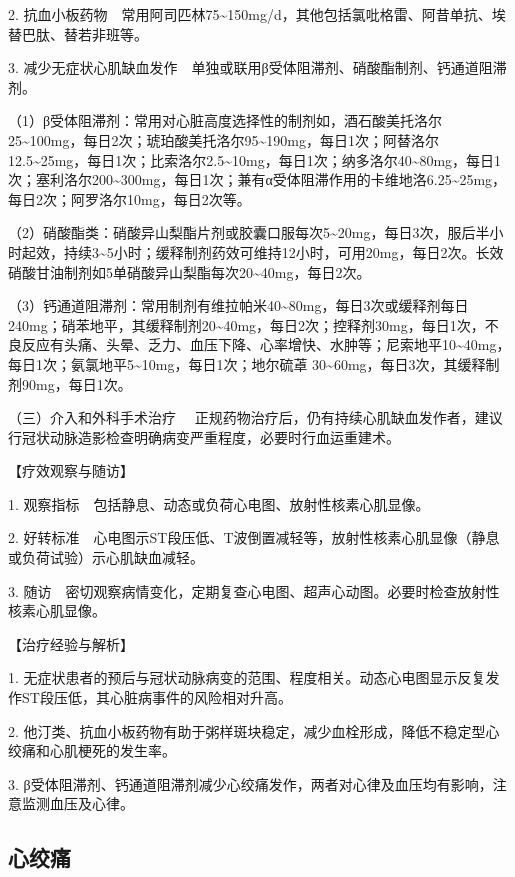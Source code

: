2.
抗血小板药物　常用阿司匹林75\textasciitilde{}150mg/d，其他包括氯吡格雷、阿昔单抗、埃替巴肽、替若非班等。

3.
减少无症状心肌缺血发作　单独或联用β受体阻滞剂、硝酸酯制剂、钙通道阻滞剂。

（1）β受体阻滞剂：常用对心脏高度选择性的制剂如，酒石酸美托洛尔25\textasciitilde{}100mg，每日2次；琥珀酸美托洛尔95\textasciitilde{}190mg，每日1次；阿替洛尔12.5\textasciitilde{}25mg，每日1次；比索洛尔2.5\textasciitilde{}10mg，每日1次；纳多洛尔40\textasciitilde{}80mg，每日1次；塞利洛尔200\textasciitilde{}300mg，每日1次；兼有α受体阻滞作用的卡维地洛6.25\textasciitilde{}25mg，每日2次；阿罗洛尔10mg，每日2次等。

（2）硝酸酯类：硝酸异山梨酯片剂或胶囊口服每次5\textasciitilde{}20mg，每日3次，服后半小时起效，持续3\textasciitilde{}5小时；缓释制剂药效可维持12小时，可用20mg，每日2次。长效硝酸甘油制剂如5单硝酸异山梨酯每次20\textasciitilde{}40mg，每日2次。

（3）钙通道阻滞剂：常用制剂有维拉帕米40\textasciitilde{}80mg，每日3次或缓释剂每日240mg；硝苯地平，其缓释制剂20\textasciitilde{}40mg，每日2次；控释剂30mg，每日1次，不良反应有头痛、头晕、乏力、血压下降、心率增快、水肿等；尼索地平10\textasciitilde{}40mg，每日1次；氨氯地平5\textasciitilde{}10mg，每日1次；地尔硫䓬
30\textasciitilde{}60mg，每日3次，其缓释制剂90mg，每日1次。

{（三）介入和外科手术治疗}
　正规药物治疗后，仍有持续心肌缺血发作者，建议行冠状动脉造影检查明确病变严重程度，必要时行血运重建术。

【疗效观察与随访】

1. 观察指标　包括静息、动态或负荷心电图、放射性核素心肌显像。

2.
好转标准　心电图示ST段压低、T波倒置减轻等，放射性核素心肌显像（静息或负荷试验）示心肌缺血减轻。

3.
随访　密切观察病情变化，定期复查心电图、超声心动图。必要时检查放射性核素心肌显像。

【治疗经验与解析】

1.
无症状患者的预后与冠状动脉病变的范围、程度相关。动态心电图显示反复发作ST段压低，其心脏病事件的风险相对升高。

2.
他汀类、抗血小板药物有助于粥样斑块稳定，减少血栓形成，降低不稳定型心绞痛和心肌梗死的发生率。

3.
β受体阻滞剂、钙通道阻滞剂减少心绞痛发作，两者对心律及血压均有影响，注意监测血压及心律。

\subsection{心绞痛}

